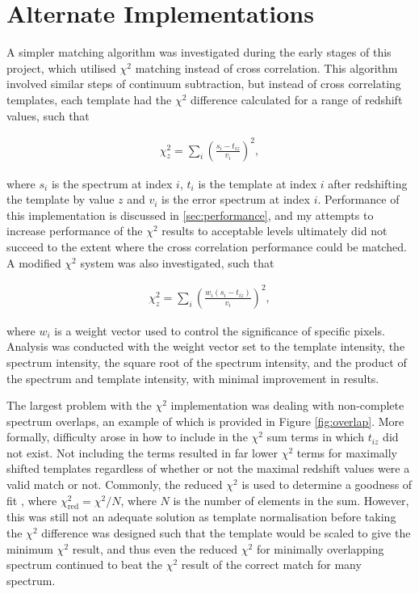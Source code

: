 \documentclass[titlesmallcaps, examinerscopy, copyrightpage]{uqthesis}
\newcommand{\brac}[1]{\left( #1 \right)}
\begin{document}
\pagebreak
\section{Alternate Implementations}

A simpler matching algorithm was investigated during the early stages of this project, which utilised $\chi^2$ matching instead of cross correlation. This algorithm involved similar steps of continuum subtraction, but instead of cross correlating templates, each template had the $\chi^2$ difference calculated for a range of redshift values, such that 

\begin{align}
\chi^2_z = \sum\limits_i \brac{\frac{s_i - t_{iz}}{v_i}}^2,
\end{align}

where $s_i$ is the spectrum at index $i$, $t_i$ is the template at index $i$ after redshifting the template by value $z$ and $v_i$ is the error spectrum at index $i$. Performance of this implementation is discussed in \ref{sec:performance}, and my attempts to increase performance of the $\chi^2$ results to acceptable levels ultimately did not succeed to the extent where the cross correlation performance could be matched. A modified $\chi^2$ system was also investigated, such that 

\begin{align}
\chi^2_z = \sum\limits_i \brac{\frac{w_i\brac{s_i - t_{iz}}}{v_i}}^2,
\end{align}

where $w_i$ is a weight vector used to control the significance of specific pixels. Analysis was conducted with the weight vector set to the template intensity, the spectrum intensity, the square root of the spectrum intensity, and the product of the spectrum and template intensity, with minimal improvement in results.

The largest problem with the $\chi^2$ implementation was dealing with non-complete spectrum overlaps, an example of which is provided in Figure \ref{fig:overlap}. More formally, difficulty arose in how to include in the $\chi^2$ sum terms in which $t_{iz}$ did not exist. Not including the terms resulted in far lower $\chi^2$ terms for maximally shifted templates regardless of whether or not the maximal redshift values were a valid match or not. Commonly, the reduced $\chi^2$ is used to determine a goodness of fit \cite{Glover}, where $\chi_{\text{red}}^2 = \chi^2 / N$, where $N$ is the number of elements in the sum. However, this was still not an adequate solution as template normalisation before taking the $\chi^2$ difference was designed such that the template would be scaled to give the minimum $\chi^2$ result, and thus even the reduced $\chi^2$ for minimally overlapping spectrum continued to beat the $\chi^2$ result of the correct match for many spectrum.
\end{document}
